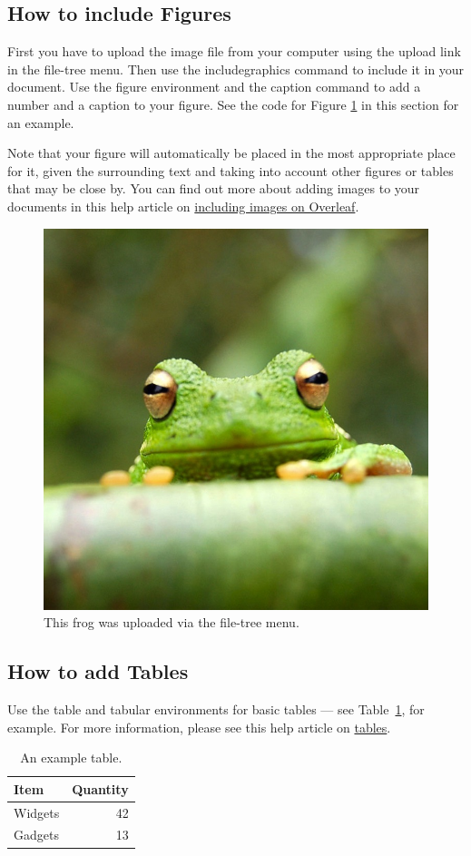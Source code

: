 \documentclass{article}
\begin{document}
\subsection{How to include Figures}

First you have to upload the image file from your computer using the upload link in the file-tree menu. Then use the includegraphics command to include it in your document. Use the figure environment and the caption command to add a number and a caption to your figure. See the code for Figure \ref{fig:frog} in this section for an example.

Note that your figure will automatically be placed in the most appropriate place for it, given the surrounding text and taking into account other figures or tables that may be close by. You can find out more about adding images to your documents in this help article on \href{https://www.overleaf.com/learn/how-to/Including_images_on_Overleaf}{including images on Overleaf}.

\begin{figure}
\centering
\includegraphics[width=0.25\linewidth]{frog.jpg}
\caption{\label{fig:frog}This frog was uploaded via the file-tree menu.}
\end{figure}

\subsection{How to add Tables}

Use the table and tabular environments for basic tables --- see Table~\ref{tab:widgets}, for example. For more information, please see this help article on \href{https://www.overleaf.com/learn/latex/tables}{tables}. 

\begin{table}
\centering
\begin{tabular}{l|r}
Item & Quantity \\\hline
Widgets & 42 \\
Gadgets & 13
\end{tabular}
\caption{\label{tab:widgets}An example table.}
\end{table}
\end{document}
